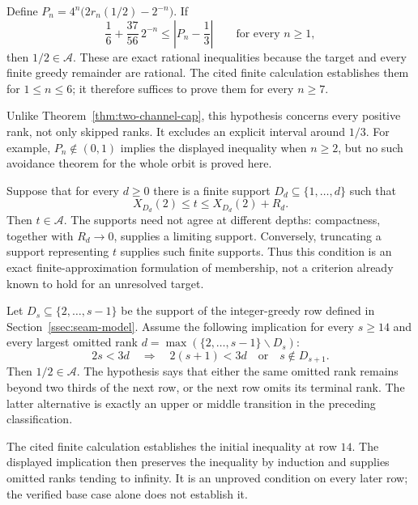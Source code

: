 \begin{thm}
\label{thm:second-channel}
Define $P_n=4^n\bigl(2r_n(1/2)-2^{-n}\bigr)$.  If
\[
 \frac16+\frac{37}{56}\,2^{-n}\le
 \left|P_n-\frac13\right|\qquad\text{for every }n\ge1,
\]
then $1/2\in\mathcal A$.  These are exact rational inequalities because
the target and every finite greedy remainder are rational.  The cited
finite calculation establishes them for $1\le n\le6$; it therefore
suffices to prove them for every $n\ge7$.

Unlike Theorem~\ref{thm:two-channel-cap}, this hypothesis concerns every
positive rank, not only skipped ranks.  It excludes an explicit interval
around $1/3$.  For example, $P_n\notin(0,1)$ implies the displayed
inequality when $n\ge2$, but no such avoidance theorem for the whole
orbit is proved here.
\end{thm}

\begin{thm}
\label{thm:straddle-closed-set}
Suppose that for every $d\ge0$ there is a finite support
$D_d\subseteq\{1,\ldots,d\}$ such that
\[
 X_{D_d}(2)\le t\le X_{D_d}(2)+R_d.
\]
Then $t\in\mathcal A$.  The supports need not agree at different depths:
compactness, together with $R_d\to0$, supplies a limiting support.
Conversely, truncating a support representing $t$ supplies such finite
supports.  Thus this condition is an exact finite-approximation
formulation of membership, not a criterion already known to hold for an
unresolved target.
\end{thm}

\begin{thm}
\label{thm:largest-skip-late}
Let $D_s\subseteq\{2,\ldots,s-1\}$ be the support of the integer-greedy
row defined in Section~\ref{ssec:seam-model}.  Assume the following implication
for every $s\ge14$ and every largest omitted rank
$d=\max(\{2,\ldots,s-1\}\smallsetminus D_s)$:
\[
 2s<3d\quad\Longrightarrow\quad
 2(s+1)<3d\quad\text{or}\quad s\notin D_{s+1}.
\]
Then $1/2\in\mathcal A$.  The hypothesis says that either the same
omitted rank remains beyond two thirds of the next row, or the next
row omits its terminal rank.  The latter alternative is exactly an
upper or middle transition in the preceding classification.

The cited finite calculation establishes the initial inequality at
row $14$.  The displayed implication then preserves the inequality
by induction and supplies omitted ranks tending to infinity.
It is an unproved condition on every later row; the verified base
case alone does not establish it.
\end{thm}

